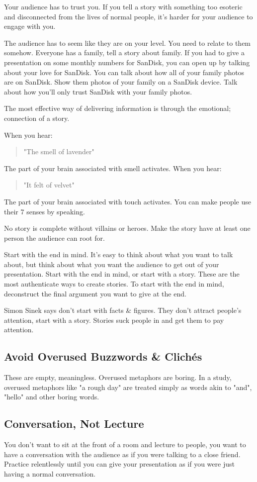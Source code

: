 \documentclass{article}
\begin{document}
Your audience has to trust you. If you tell a story with something too
esoteric and disconnected from the lives of normal people, it's harder
for your audience to engage with you.

The audience has to seem like they are on your level. You need to relate
to them somehow. Everyone has a family, tell a story about family. If
you had to give a presentation on some monthly numbers for SanDisk, you
can open up by talking about your love for SanDisk. You can talk about
how all of your family photos are on SanDisk. Show them photos of your
family on a SanDisk device. Talk about how you'll only trust SanDisk
with your family photos.

The most effective way of delivering information is through the
emotional; connection of a story.

When you hear:
\begin{quote}
    "The smell of lavender"
\end{quote}
The part of your brain associated with smell activates. When you hear:
\begin{quote}
    "It felt of velvet"
\end{quote}
The part of your brain associated with touch activates. You can make
people use their 7 senses by speaking.

No story is complete without villains or heroes. Make the story have at
least one person the audience can root for.

Start with the end in mind. It's easy to think about what you want to
talk about, but think about what you want the audience to get out of
your presentation. Start with the end in mind, or start with a story.
These are the most authenticate ways to create stories. To start with
the end in mind, deconstruct the final argument you want to give at the
end.

Simon Sinek says don't start with facts \& figures. They don't attract
people's attention, start with a story. Stories suck people in and get
them to pay attention.
\subsection{Avoid Overused Buzzwords \& Clichés}
These are empty, meaningless. Overused metaphors are boring. In a study,
overused metaphors like "a rough day" are treated simply as words akin
to "and", "hello" and other boring words.
\subsection{Conversation, Not Lecture}
You don't want to sit at the front of a room and lecture to people, you
want to have a conversation with the audience as if you were talking to
a close friend. Practice relentlessly until you can give your
presentation as if you were just having a normal conversation.
\end{document}
